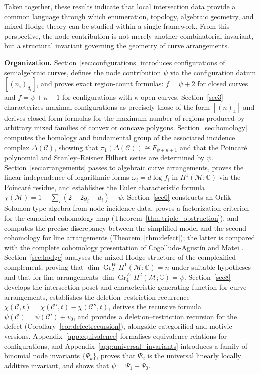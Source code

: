 \documentclass[article,11pt]{amsart} \numberwithin{equation}{section}
\numberwithin{equation}{section}
\begin{document}
{\medskip
Taken together, these results indicate that local intersection data provide a common language through which enumeration, topology, algebraic geometry, and mixed Hodge theory can be studied within a single framework. From this perspective, the node contribution is not merely another combinatorial invariant, but a structural invariant governing the geometry of curve arrangements.

\medskip
\noindent\textbf{Organization.}
Section~\ref{sec:configurations} introduces configurations of semialgebraic curves, defines the node contribution $\psi$ via the configuration datum $[(n_i)_{d_i}]$, and proves exact region-count formulas: $f=\psi+2$ for closed curves and $f=\psi+\kappa+1$ for configurations with $\kappa$ open curves. Section~\ref{sec3} characterizes maximal configurations as precisely those of the form $[(n)_4]$ and derives closed-form formulas for the maximum number of regions produced by arbitrary mixed families of convex or concave polygons. Section~\ref{sec:homology} computes the homology and fundamental group of the associated incidence complex $\Delta(\mathcal C)$, showing that $\pi_1(\Delta(\mathcal C))\cong F_{\psi+\kappa+1}$ and that the Poincaré polynomial and Stanley--Reisner Hilbert series are determined by $\psi$. Section~\ref{sec:arrangements} passes to algebraic curve arrangements, proves the linear independence of logarithmic forms $\omega_i=d\log f_i$ in $H^1(\mathcal M;\mathbb C)$ via the Poincaré residue, and establishes the Euler characteristic formula $\chi(\mathcal M)=1-\sum_i(2-2g_i-d_i)+\psi$. Section~\ref{sec6} constructs an Orlik--Solomon type algebra from node-incidence data, proves a factorization criterion for the canonical cohomology map (Theorem~\ref{thm:triple_obstruction}), and computes the precise discrepancy between the simplified model and the second cohomology for line arrangements (Theorem~\ref{thm:defect}); the latter is compared with the complete cohomology presentation of Cogolludo-Agust\'in and Matei \cite{CogolludoMatei2012}. Section~\ref{sec:hodge} analyses the mixed Hodge structure of the complexified complement, proving that $\dim \operatorname{Gr}_2^W H^1(\mathcal M;\mathbb C)=n$ under suitable hypotheses and that for line arrangements $\dim \operatorname{Gr}_4^W H^2(\mathcal M;\mathbb C)=\psi$. Section~\ref{sec8} develops the intersection poset and characteristic generating function for curve arrangements, establishes the deletion--restriction recurrence $\chi(\mathcal C,t)=\chi(\mathcal C',t)-\chi(\mathcal C'',t)$, derives the recursive formula $\psi(\mathcal C)=\psi(\mathcal C')+v_0$, and provides a deletion--restriction recursion for the defect (Corollary~\ref{cor:defectrecursion}), alongside categorified and motivic versions. Appendix~\ref{app:equivalence} formalises equivalence relations for configurations, and Appendix~\ref{app:universal_invariants} introduces a family of binomial node invariants $\{\Psi_k\}$, proves that $\Psi_2$ is the universal linearly locally additive invariant, and shows that $\psi=\Psi_1-\Psi_0$.

}
\end{document}
